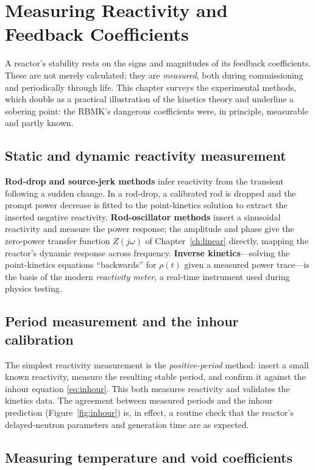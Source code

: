 \chapter{Measuring Reactivity and Feedback Coefficients}
\label{ch:measure}

A reactor's stability rests on the signs and magnitudes of its feedback
coefficients. These are not merely calculated; they are \emph{measured}, both
during commissioning and periodically through life. This chapter surveys the
experimental methods, which double as a practical illustration of the kinetics
theory and underline a sobering point: the RBMK's dangerous coefficients were, in
principle, measurable and partly known.

\section{Static and dynamic reactivity measurement}

\textbf{Rod-drop and source-jerk methods} infer reactivity from the transient
following a sudden change. In a rod-drop, a calibrated rod is dropped and the
prompt power decrease is fitted to the point-kinetics solution to extract the
inserted negative reactivity. \textbf{Rod-oscillator methods} insert a sinusoidal
reactivity and measure the power response; the amplitude and phase give the
zero-power transfer function $Z(j\omega)$ of Chapter~\ref{ch:linear} directly,
mapping the reactor's dynamic response across frequency. \textbf{Inverse
kinetics}---solving the point-kinetics equations ``backwards'' for $\rho(t)$ given a
measured power trace---is the basis of the modern \emph{reactivity meter}, a
real-time instrument used during physics testing.

\section{Period measurement and the inhour calibration}

The simplest reactivity measurement is the \emph{positive-period} method: insert a
small known reactivity, measure the resulting stable period, and confirm it against
the inhour equation \eqref{eq:inhour}. This both measures reactivity and validates
the kinetics data. The agreement between measured periods and the inhour prediction
(Figure~\ref{fig:inhour}) is, in effect, a routine check that the reactor's
delayed-neutron parameters and generation time are as expected.

\section{Measuring temperature and void coefficients}

